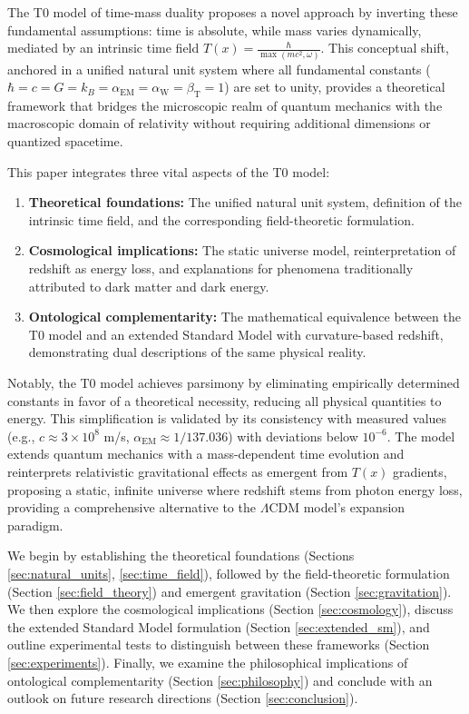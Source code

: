 \documentclass[aps,prl,twocolumn,superscriptaddress,nofootinbib]{revtex4-2}
\newcommand{\Tfield}{T(x)}
\newcommand{\alphaEM}{\alpha_{\text{EM}}}
\newcommand{\alphaW}{\alpha_{\text{W}}}
\newcommand{\betaT}{\beta_{\text{T}}}
\newcommand{\LCDM}{\Lambda\text{CDM}}
\begin{document}
	The T0 model of time-mass duality proposes a novel approach by inverting these fundamental assumptions: time is absolute, while mass varies dynamically, mediated by an intrinsic time field $\Tfield = \frac{\hbar}{\max(mc^2, \omega)}$. This conceptual shift, anchored in a unified natural unit system where all fundamental constants ($\hbar = c = G = k_B = \alphaEM = \alphaW = \betaT = 1$) are set to unity, provides a theoretical framework that bridges the microscopic realm of quantum mechanics with the macroscopic domain of relativity without requiring additional dimensions or quantized spacetime.
	
	This paper integrates three vital aspects of the T0 model:
	\begin{enumerate}
		\item \textbf{Theoretical foundations:} The unified natural unit system, definition of the intrinsic time field, and the corresponding field-theoretic formulation.
		\item \textbf{Cosmological implications:} The static universe model, reinterpretation of redshift as energy loss, and explanations for phenomena traditionally attributed to dark matter and dark energy.
		\item \textbf{Ontological complementarity:} The mathematical equivalence between the T0 model and an extended Standard Model with curvature-based redshift, demonstrating dual descriptions of the same physical reality.
	\end{enumerate}
	
	Notably, the T0 model achieves parsimony by eliminating empirically determined constants in favor of a theoretical necessity, reducing all physical quantities to energy. This simplification is validated by its consistency with measured values (e.g., $c \approx 3 \times 10^8$ m/s, $\alphaEM \approx 1/137.036$) with deviations below $10^{-6}$. The model extends quantum mechanics with a mass-dependent time evolution and reinterprets relativistic gravitational effects as emergent from $\Tfield$ gradients, proposing a static, infinite universe where redshift stems from photon energy loss, providing a comprehensive alternative to the $\LCDM$ model's expansion paradigm.
	
	We begin by establishing the theoretical foundations (Sections \ref{sec:natural_units}, \ref{sec:time_field}), followed by the field-theoretic formulation (Section \ref{sec:field_theory}) and emergent gravitation (Section \ref{sec:gravitation}). We then explore the cosmological implications (Section \ref{sec:cosmology}), discuss the extended Standard Model formulation (Section \ref{sec:extended_sm}), and outline experimental tests to distinguish between these frameworks (Section \ref{sec:experiments}). Finally, we examine the philosophical implications of ontological complementarity (Section \ref{sec:philosophy}) and conclude with an outlook on future research directions (Section \ref{sec:conclusion}).
	
\end{document}
